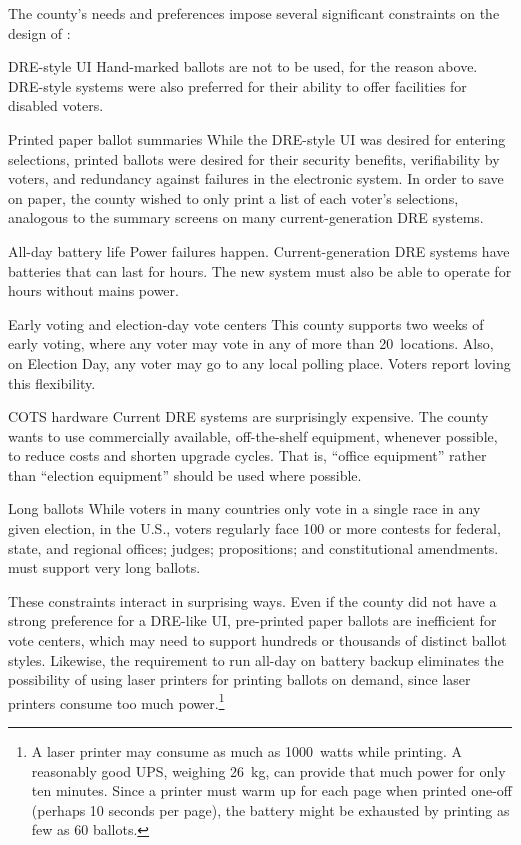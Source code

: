 The county's needs and preferences 
impose several significant constraints on the design of \projname:
\begin{compactdesc}
\item[DRE-style UI] 
    Hand-marked ballots are not to be used, for the reason above.
    DRE-style
    systems were also preferred for their ability to offer facilities for
    disabled voters.

\item[Printed paper ballot summaries]
    While the DRE-style UI was
    desired for entering selections, printed ballots were desired for their
    security benefits, verifiability by voters, and redundancy against failures in the
    electronic system. In order to save on paper, the county wished to
    only print a list of each voter's selections, analogous to the
    summary screens on many current-generation DRE systems.

\item[All-day battery life]
    Power failures happen. Current-generation DRE systems have
    batteries that can last for hours. The new system must also be
    able to operate for hours without mains power.

\item[Early voting and election-day vote centers]
    This county supports two weeks of early voting, where any voter
    may vote in any of more than 20~locations. Also,
    on Election Day, any voter may go to any local polling
    place. Voters report loving this flexibility.

\item[COTS hardware]
    Current DRE systems are surprisingly expensive. The county wants
    to use commercially available, off-the-shelf equipment, whenever
    possible, to reduce costs and shorten upgrade cycles.
    That is, ``office equipment''  rather than ``election
    equipment'' should be used where possible.

\item[Long ballots]
    While voters in many countries only vote in a single race in any
    given election, in the U.S., voters regularly face
    100 or more contests for federal, state, and regional
    offices; judges; propositions;
    and constitutional amendments. \projname must support very long
    ballots.
\end{compactdesc}

These constraints interact in surprising ways. 
Even if the county did not have a strong preference for a DRE-like UI, 
pre-printed paper
ballots are inefficient for vote centers, which may
need to support hundreds or thousands of distinct ballot
styles. Likewise, the requirement to run all-day on battery backup
eliminates the possibility of using laser printers for printing
ballots on demand, since laser printers consume too
much power.\footnote{%
   A laser printer may consume as much as 1000~watts
  while printing. A reasonably good UPS, weighing 26~kg, can provide
  that much power for only ten minutes. Since a printer must 
  warm up for each page when printed one-off (perhaps 10
  seconds per page), the battery might be exhausted by printing
  as few as 60 ballots.
 }

